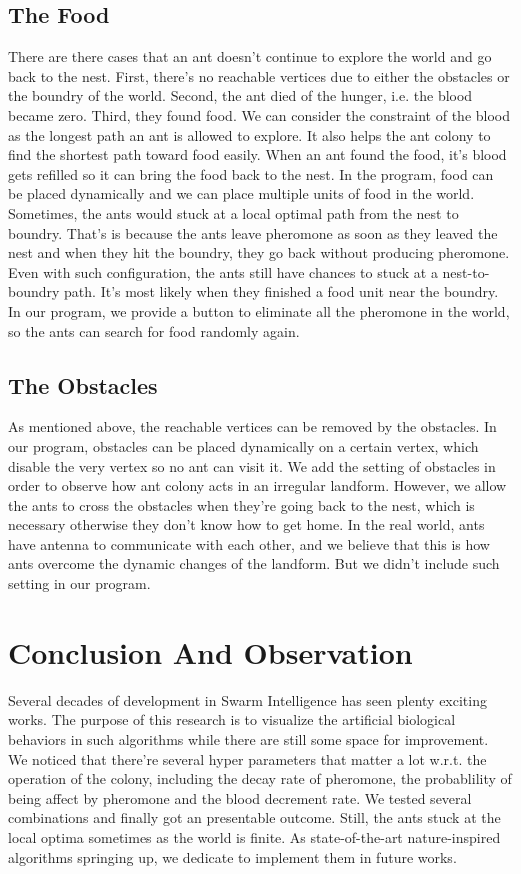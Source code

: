 \documentclass[12pt,journal,compsoc]{IEEEtran}
\begin{document}
\subsection{The Food}
There are there cases that an ant doesn't continue to explore the world and go back to the nest. First, there's no reachable vertices due to either the obstacles or the boundry of the world. Second, the ant died of the hunger, i.e. the blood became zero. Third, they found food. We can consider the constraint of the blood as the longest path an ant is allowed to explore. It also helps the ant colony to find the shortest path toward food easily. When an ant found the food, it's blood gets refilled so it can bring the food back to the nest. In the program, food can be placed dynamically and we can place multiple units of food in the world. Sometimes, the ants would stuck at a local optimal path from the nest to boundry. That's is because the ants leave pheromone as soon as they leaved the nest and when they hit the boundry, they go back without producing pheromone. Even with such configuration, the ants still have chances to stuck at a nest-to-boundry path. It's most likely when they finished a food unit near the boundry. In our program, we provide a button to eliminate all the pheromone in the world, so the ants can search for food randomly again.

\subsection{The Obstacles}
As mentioned above, the reachable vertices can be removed by the obstacles. In our program, obstacles can be placed dynamically on a certain vertex, which disable the very vertex so no ant can visit it. We add the setting of obstacles in order to observe how ant colony acts in an irregular landform. However, we allow the ants to cross the obstacles when they're going back to the nest, which is necessary otherwise they don't know how to get home. In the real world, ants have antenna to communicate with each other, and we believe that this is how ants overcome the dynamic changes of the landform. But we didn't include such setting in our program.


\section{Conclusion And Observation}
Several decades of development in Swarm Intelligence has seen plenty exciting works. The purpose of this research is to visualize the artificial biological behaviors in such algorithms while there are still some space for improvement. We noticed that there're several hyper parameters that matter a lot w.r.t. the operation of the colony, including the decay rate of pheromone, the probablility of being affect by pheromone and the blood decrement rate. We tested several combinations and finally got an presentable outcome. Still, the ants stuck at the local optima sometimes as the world is finite. As state-of-the-art nature-inspired algorithms springing up, we dedicate to implement them in future works.
\end{document}
